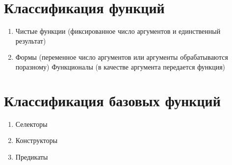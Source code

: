 \documentclass[a4paper,12pt]{article}
\begin{document}
	\section*{Классификация функций}
	
	\begin{enumerate}
		\item Чистые функции (фиксированное число аргументов и единственный результат)
		\item Формы (переменное число аргументов или аргументы обрабатываются поразному)
		Функционалы (в качестве аргумента передается функция)
	\end{enumerate}

\section*{Классификация базовых функций}

\begin{enumerate}
	\item Селекторы
	\item Конструкторы
	\item Предикаты
\end{enumerate}

	
\end{document}
